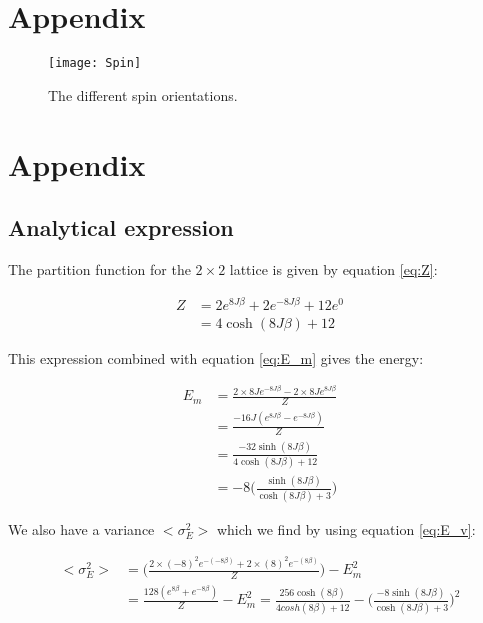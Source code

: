 \documentclass{article}
\begin{document}
\clearpage

\appendix %

\section{Appendix}

\begin{figure}[H]
	\centering
	\texttt{[image: Spin]}
	\caption{The different spin orientations.}
	\label{fig:spinn}
\end{figure}

\section{Appendix}
\subsection*{Analytical expression}

The partition function for the $2\times2$ lattice is given by equation \ref{eq:Z}:

\begin{equation}
\begin{split}
Z&=2e^{8J\beta}+2e^{-8J\beta}+12e^0\\
&=4\cosh{(8J\beta)}+12
\end{split}
\label{eq:calc_Z}
\end{equation}

This expression combined with equation \ref{eq:E_m} gives the energy:

\begin{equation}
\begin{split}
E_m &= \frac{2\times8Je^{-8J\beta}-2\times8Je^{8J\beta}}{Z}\\
&=\frac{-16J(e^{8J\beta}-e^{-8J\beta})}{Z}\\
&=\frac{-32\sinh{(8J\beta)}}{4\cosh{(8J\beta)}+12}\\
&=-8\bigg(\frac{\sinh{(8J\beta)}}{\cosh{(8J\beta)}+3}\bigg)
\label{eq:calc_E}
\end{split}
\end{equation}

We also have a variance $<\sigma_E^2>$ which we find by using equation \ref{eq:E_v}:

\begin{equation}
\begin{split}
<\sigma_E^2>&=\bigg(\frac{2\times(-8)^2e^{-(-8\beta)} + 2 \times (8)^2e^{-(8\beta)}}{Z}\bigg)-E_m^2\\
&=\frac{128(e^{8\beta}+e^{-8\beta})}{Z}-E_m^2=\frac{256\cosh{(8\beta)}}{4cosh(8\beta)+12}-\bigg(\frac{-8\sinh{(8J\beta)}}{\cosh{(8J\beta)}+3}\bigg)^2
\label{eq:calc_Ev}
\end{split}
\end{equation}
\end{document}
